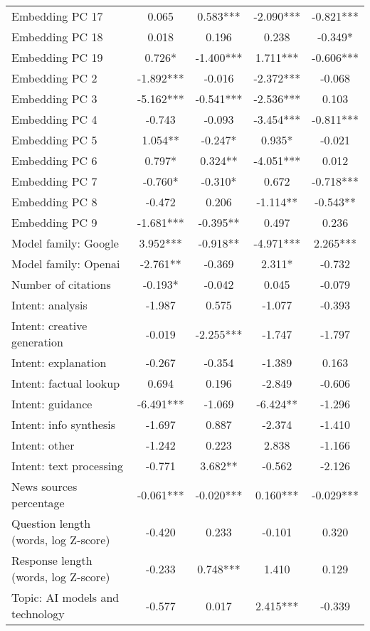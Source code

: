 \begin{table}[htbp]
\begin{tabular}{p{4cm}cccc}
Embedding PC 17 & 0.065 & 0.583*** & -2.090*** & -0.821*** \\
Embedding PC 18 & 0.018 & 0.196 & 0.238 & -0.349* \\
Embedding PC 19 & 0.726* & -1.400*** & 1.711*** & -0.606*** \\
Embedding PC 2 & -1.892*** & -0.016 & -2.372*** & -0.068 \\
Embedding PC 3 & -5.162*** & -0.541*** & -2.536*** & 0.103 \\
Embedding PC 4 & -0.743 & -0.093 & -3.454*** & -0.811*** \\
Embedding PC 5 & 1.054** & -0.247* & 0.935* & -0.021 \\
Embedding PC 6 & 0.797* & 0.324** & -4.051*** & 0.012 \\
Embedding PC 7 & -0.760* & -0.310* & 0.672 & -0.718*** \\
Embedding PC 8 & -0.472 & 0.206 & -1.114** & -0.543** \\
Embedding PC 9 & -1.681*** & -0.395** & 0.497 & 0.236 \\
Model family: Google & 3.952*** & -0.918** & -4.971*** & 2.265*** \\
Model family: Openai & -2.761** & -0.369 & 2.311* & -0.732 \\
Number of citations & -0.193* & -0.042 & 0.045 & -0.079 \\
Intent: analysis & -1.987 & 0.575 & -1.077 & -0.393 \\
Intent: creative generation & -0.019 & -2.255*** & -1.747 & -1.797 \\
Intent: explanation & -0.267 & -0.354 & -1.389 & 0.163 \\
Intent: factual lookup & 0.694 & 0.196 & -2.849 & -0.606 \\
Intent: guidance & -6.491*** & -1.069 & -6.424** & -1.296 \\
Intent: info synthesis & -1.697 & 0.887 & -2.374 & -1.410 \\
Intent: other & -1.242 & 0.223 & 2.838 & -1.166 \\
Intent: text processing & -0.771 & 3.682** & -0.562 & -2.126 \\
News sources percentage & -0.061*** & -0.020*** & 0.160*** & -0.029*** \\
Question length (words, log Z-score) & -0.420 & 0.233 & -0.101 & 0.320 \\
Response length (words, log Z-score) & -0.233 & 0.748*** & 1.410 & 0.129 \\
Topic: AI models and technology & -0.577 & 0.017 & 2.415*** & -0.339 \\

\end{tabular}
\end{table}
